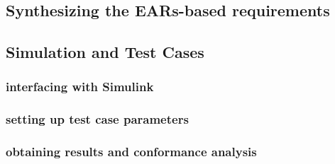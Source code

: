 \subsection{Synthesizing the EARs-based requirements}
\subsection{Simulation and Test Cases}
\subsubsection{interfacing with Simulink}
\subsubsection{setting up test case parameters}
\subsubsection{obtaining results and conformance analysis}